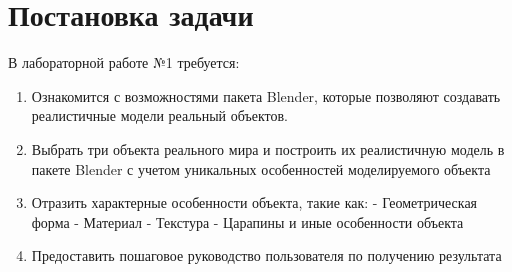 \documentclass[areasetadvanced]{scrartcl}
\begin{document}
\section{Постановка задачи}
В лабораторной работе №1 требуется:
\begin{enumerate}
    \item Ознакомится с возможностями пакета Blender, которые позволяют создавать реалистичные модели реальный объектов.
    \item Выбрать три объекта реального мира и построить их реалистичную модель в пакете Blender с учетом уникальных особенностей моделируемого объекта
    \item Отразить характерные особенности объекта, такие как:
    \subitem - Геометрическая форма
    \subitem - Материал
    \subitem - Текстура
    \subitem - Царапины и иные особенности объекта
    \item Предоставить пошаговое руководство пользователя по получению результата
\end{enumerate}
\newpage
\end{document}
